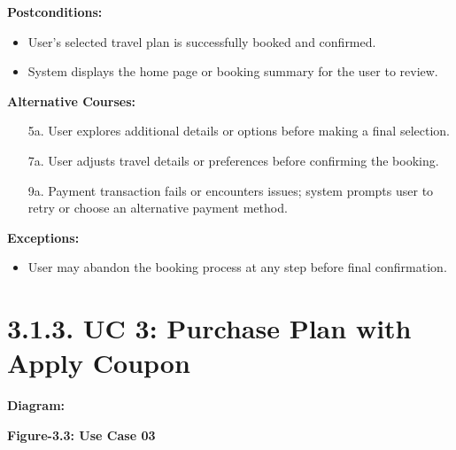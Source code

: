 \documentclass{scrreprt}
\begin{document}
\textbf{Postconditions:}
\begin{itemize}
    \item User's selected travel plan is successfully booked and confirmed.
    \item System displays the home page or booking summary for the user to review.
\end{itemize}

\textbf{Alternative Courses:}
\begin{itemize}
    \item[5a.] User explores additional details or options before making a final selection.
    \item[7a.] User adjusts travel details or preferences before confirming the booking.
    \item[9a.] Payment transaction fails or encounters issues; system prompts user to retry or choose an alternative payment method.
\end{itemize}

\textbf{Exceptions:}
\begin{itemize}
    \item User may abandon the booking process at any step before final confirmation.
\end{itemize}

\section*{\textbf{3.1.3. UC 3: Purchase Plan with Apply Coupon}}
\textbf{Diagram:}
\newline
\newline
{}
\begin{center}
    \parbox{0.8\textwidth}{ 
        \centering
        \textbf{Figure-3.3: Use Case 03}
    }
\end{center}
\end{document}
